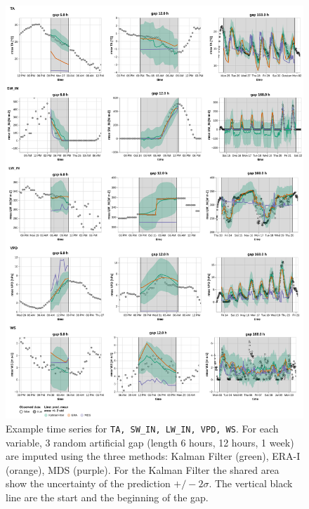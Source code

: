 \documentclass{article}
\newcommand{\imgwidth}{6in}
\begin{document}
\begin{figure}
\centerline{\includegraphics[width=\imgwidth]{timeseries_1}}
\caption{Example time series for \texttt{TA, SW\_IN, LW\_IN, VPD, WS}. For each variable, 3 random artificial gap (length 6 hours, 12 hours, 1 week) are imputed using the three methods: Kalman Filter (green), ERA-I (orange), MDS (purple). For the Kalman Filter the shared area show the uncertainty of the prediction $+/- 2 \sigma$. The vertical black line are the start and the beginning of the gap.}
\label{fig:ts_1_0}
\end{figure}
\restoregeometry
\end{document}
